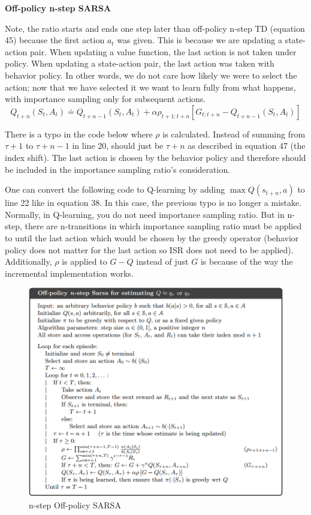 \documentclass{article}
\begin{document}
\noindent
\textbf{Off-policy n-step SARSA}

\noindent
Note, the ratio starts and ends one step later than off-policy n-step TD
(equation 45) because the first action $a_{t}$ was given. This is because we are
updating a state-action pair. When updating a value function, the last action is
not taken under policy. When updating a state-action pair, the last action was
taken with behavior policy. In other words, we do not care how likely we were to
select the action; now that we have selected it we want to learn fully from what
happens, with importance sampling only for subsequent actions.
\begin{equation}
Q_{t+n}\left(S_{t}, A_{t}\right) \doteq Q_{t+n-1}\left(S_{t}, A_{t}\right)+\alpha \rho_{t+1: t+n}\left[G_{t: t+n}-Q_{t+n-1}\left(S_{t}, A_{t}\right)\right]
\end{equation}

\noindent
There is a typo in the code below where $\rho$ is calculated. Instead of summing
from $\tau + 1$ to $\tau + n -1$ in line 20, should just be $\tau + n$ as
described in equation 47 (the index shift). The last action is chosen by the
behavior policy and therefore should be included in the importance sampling
ratio's consideration.

One can convert the following code to Q-learning by adding $\max Q(s_{t+n}, a)$
to line 22 like in equation 38. In this case, the previous typo is no longer a
mistake. Normally, in Q-learning, you do not need importance sampling ratio. But
in n-step, there are n-transitions in which importance sampling ratio must be
applied to until the last action which would be chosen by the greedy operator
(behavior policy does not matter for the last action so ISR does not need to be
applied). Additionally, $\rho$ is applied to $G - Q$ instead of just $G$ is
because of the way the incremental implementation works.

\begin{figure}[h]
\includegraphics[scale=0.45]{nstep_offpolicy_sarsa}
\centering
\caption{n-step Off-policy SARSA}
\end{figure}
\end{document}
